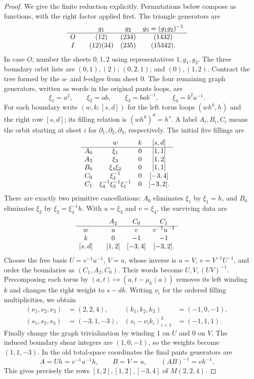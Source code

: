 \begin{proof}
We give the finite reduction explicitly. Permutations below compose as functions, with the right factor applied first. The triangle generators are
\[
\begin{array}{c@{\qquad}ccc}
 &g_1&g_2&g_3=(g_1g_2)^{-1}\\ \hline
 O&(12)&(234)&(1432)\\
 I&(12)(34)&(235)&(15342).
\end{array}
\]
In case $O$, number the sheets $0,1,2$ using representatives $1,g_1,g_2$. The three boundary orbit lists are $(0,1),(2)$; $(0,2,1)$; and $(0),(1,2)$. Contract the tree formed by the $a$- and $b$-edges from sheet $0$. The four remaining graph generators, written as words in the original pants loops, are
\[
\xi_1=a^2,\qquad \xi_2=ab,\qquad
\xi_3=bab^{-1},\qquad \xi_4=b^2a^{-1}.
\]
For each boundary write $(w,k;[s,d])$ for the left torus loops $(wh^k,h)$ and the right row $[s,d]$; its filling relation is $(wh^k)^d=h^s$. A label $A_i,B_i,C_i$ means the orbit starting at sheet $i$ for $\partial_1,\partial_2,\partial_3$, respectively. The initial five fillings are
\[
\begin{array}{c@{\quad}c@{\quad}r@{\quad}c}
 &w&k&[s,d]\\ \hline
 A_0&\xi_1&0&[1,1]\\
 A_2&\xi_3&0&[1,2]\\
 B_0&\xi_4\xi_2&0&[1,1]\\
 C_0&\xi_2^{-1}&0&[-3,4]\\
 C_1&\xi_4^{-1}\xi_3^{-1}\xi_1^{-1}&0&[-3,2].
\end{array}
\]
There are exactly two primitive cancellations: $A_0$ eliminates $\xi_1$ by $\xi_1=h$, and $B_0$ eliminates $\xi_2$ by $\xi_2=\xi_4^{-1}h$. With $u=\xi_3$ and $v=\xi_4$, the surviving data are
\[
\begin{array}{c@{\qquad}ccc}
 &A_2&C_0&C_1\\ \hline
 w&u&v&v^{-1}u^{-1}\\
 k&0&-1&-1\\
 {[s,d]}&[1,2]&[-3,4]&[-3,2].
\end{array}
\]
Choose the free basis $U=v^{-1}u^{-1}$, $V=u$, whose inverse is $u=V$, $v=V^{-1}U^{-1}$, and order the boundaries as $(C_1,A_2,C_0)$. Their words become $U,V,(UV)^{-1}$. Precomposing each torus by $(a,t)\mapsto(a,t-\mu_k(a))$ removes its left winding $k$ and changes the right weight to $s-dk$. Writing $\nu_i$ for the ordered filling multiplicities, we obtain
\[
\begin{aligned}
(\nu_1,\nu_2,\nu_3)&=(2,2,4),
& (k_1,k_2,k_3)&=(-1,0,-1),\\
(s_1,s_2,s_3)&=(-3,1,-3),
& (s_i-\nu_ik_i)_{i=1}^3&=(-1,1,1).
\end{aligned}
\]
Finally change the graph trivialization by winding $1$ on $U$ and $0$ on $V$. The induced boundary shear integers are $(1,0,-1)$, so the weights become $(1,1,-3)$. In the old total-space coordinates the final pants generators are
\[
A=Uh=v^{-1}u^{-1}h,\qquad B=V=u,\qquad
(AB)^{-1}=vh^{-1}.
\]
This gives precisely the rows $[1,2],[1,2],[-3,4]$ of $M(2,2,4)$.


\end{proof}
